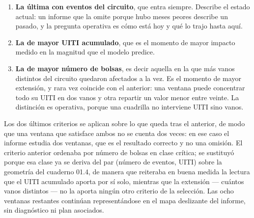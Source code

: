 \documentclass[11pt,a4paper]{article}
\begin{document}
\begin{enumerate}
  \item \textbf{La última con eventos del circuito}, que entra siempre. Describe el estado actual:
        un informe que la omite porque hubo meses peores describe un pasado, y la pregunta operativa
        es cómo está hoy y qué lo trajo hasta aquí.
  \item \textbf{La de mayor UITI acumulado}, que es el momento de mayor impacto medido en la
        magnitud que el modelo predice.
  \item \textbf{La de mayor número de bolsas}, es decir aquella en la que más vanos distintos del
        circuito quedaron afectados a la vez. Es el momento de mayor extensión, y rara vez coincide
        con el anterior: una ventana puede concentrar todo su UITI en dos vanos y otra repartir un
        valor menor entre veinte. La distinción es operativa, porque una cuadrilla no interviene
        UITI sino vanos.
\end{enumerate}

Los dos últimos criterios se aplican sobre lo que queda tras el anterior, de modo que una ventana
que satisface ambos no se cuenta dos veces: en ese caso el informe estudia dos ventanas, que es el
resultado correcto y no una omisión. El criterio anterior ordenaba por número de bolsas en clase
crítica; se sustituyó porque esa clase ya se deriva del par (número de eventos, UITI) sobre la
geometría del cuaderno 01.4, de manera que reiteraba en buena medida la lectura que el UITI
acumulado aporta por sí solo, mientras que la extensión --- cuántos vanos distintos --- no la aporta
ningún otro criterio de la selección. Las ocho ventanas restantes continúan representándose en el
mapa deslizante del informe, sin diagnóstico ni plan asociados.
\end{document}
